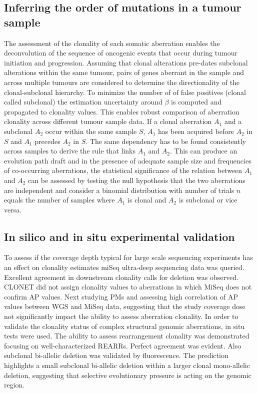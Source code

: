 	\subsection{Inferring the order of mutations in a tumour sample}
	The assessment of the clonality of each somatic aberration enables the deconvolution of the sequence of oncogenic events that occur during tumour initiation and progression.
	Assuming that clonal alterations pre-dates subclonal alterations within the same tumour, pairs of genes aberrant in the sample and across multiple tumours are considered to determine the directionality of the clonal-subclonal hierarchy.
	To minimize the number of of false positives (clonal called subclonal) the estimation uncertainty around $\beta$ is computed and propagated to clonality values.
	This enables robust comparison of aberration clonality across different tumour sample data.
	If a clonal aberration $A_1$ and a subclonal $A_2$ occur within the same sample $S$, $A_1$ has been acquired before $A_2$ in $S$ and $A_1$ precedes $A_2$ in $S$.
	The same dependency has to be found consistently across samples to derive the rule that links $A_1$ and $A_2$.
	This can produce an evolution path draft and in the presence of adequate sample size and frequencies of co-occurring aberrations, the statistical significance of the relation between $A_1$ and $A_2$ can be assessed by testing the null hypothesis that the two aberrations are independent and consider a binomial distribution  with number of trials $n$ equals the number of samples where $A_1$ is clonal and $A_2$ is subclonal or vice versa.

	\subsection{In silico and in situ experimental validation}
	To assess if the coverage depth typical for large scale sequencing experiments has an effect on clonality estimates miSeq ultra-deep sequencing data was queried.
	Excellent agreement in downstream clonality calls for deletion was observed.
	CLONET did not assign clonality values to aberrations in which MiSeq does not confirm AP values.
	Next studying PMs and assessing high correlation of AP values between WGS and MiSeq data, suggesting that the study coverage dose not significantly impact the ability to assess aberration clonality.
	In order to validate the clonality status of complex structural genomic aberrations, in situ tests were used.
	The ability to assess rearrangement clonality was demonstrated focusing on well-characterized REARRs.
	Perfect agreement was evident.
	Also subclonal bi-allelic deletion was validated by fluorescence.
	The prediction highlights a small subclonal bi-allelic deletion within a larger clonal mono-allelic deletion, suggesting that selective evolutionary pressure is acting on the genomic region.

